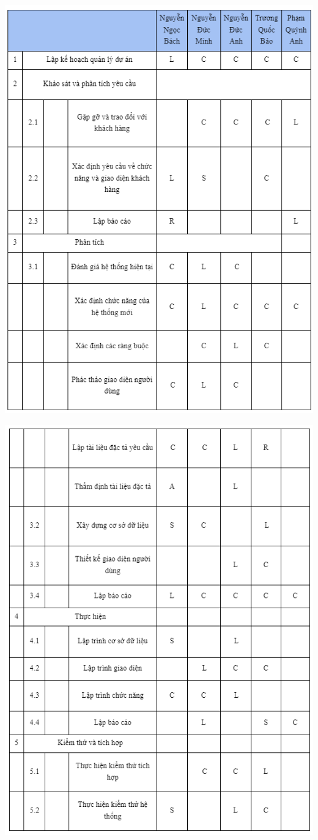 \documentclass[12pt]{article}
\begin{document}
\includegraphics[width=15cm]{II_6_5_2.png}
\par
\hspace{-0.6cm}\includegraphics[width=15cm]{II_6_5_3.png}
\end{document}

